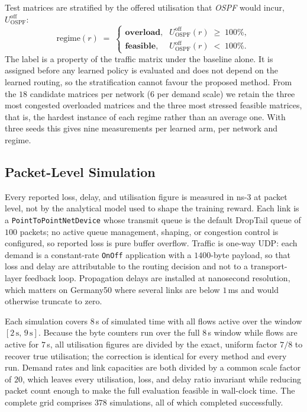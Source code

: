 Test matrices are stratified by the offered utilisation that \emph{OSPF} would
incur, $U^{\mathrm{off}}_{\mathrm{OSPF}}$:
\begin{equation}
  \mathrm{regime}(r) \;=\;
  \begin{cases}
    \textbf{overload}, & U^{\mathrm{off}}_{\mathrm{OSPF}}(r) \;\ge\; 100\%,\\[2pt]
    \textbf{feasible}, & U^{\mathrm{off}}_{\mathrm{OSPF}}(r) \;<\; 100\%.
  \end{cases}
  \label{eq:regime}
\end{equation}
The label is a property of the traffic matrix under the baseline alone. It is
assigned before any learned policy is evaluated and does not depend on the
learned routing, so the stratification cannot favour the proposed method. From
the $18$ candidate matrices per network ($6$ per demand scale) we retain the
three most congested overloaded matrices and the three most stressed feasible
matrices, that is, the hardest instance of each regime rather than an average
one. With three seeds this gives nine measurements per learned arm, per network
and regime.

\subsection{Packet-Level Simulation}
\label{sec:setup-ns3}

Every reported loss, delay, and utilisation figure is measured in ns-3 at packet
level, not by the analytical model used to shape the training reward. Each link
is a \texttt{PointToPointNetDevice} whose transmit queue is the default DropTail
queue of $100$ packets; no active queue management, shaping, or congestion
control is configured, so reported loss is pure buffer overflow. Traffic is
one-way UDP: each demand is a constant-rate \texttt{OnOff} application with a
$1400$-byte payload, so that loss and delay are attributable to the routing
decision and not to a transport-layer feedback loop. Propagation delays are
installed at nanosecond resolution, which matters on Germany50 where several
links are below $1$\,ms and would otherwise truncate to zero.

Each simulation covers $8$\,s of simulated time with all flows active over the
window $[2\,\mathrm{s},\,9\,\mathrm{s}]$. Because the byte counters run over the
full $8$\,s window while flows are active for $7$\,s, all utilisation figures are
divided by the exact, uniform factor $7/8$ to recover true utilisation; the
correction is identical for every method and every run. Demand rates and link
capacities are both divided by a common scale factor of $20$, which leaves every
utilisation, loss, and delay ratio invariant while reducing packet count enough to
make the full evaluation feasible in wall-clock time. The complete grid comprises
$378$ simulations, all of which completed successfully.

